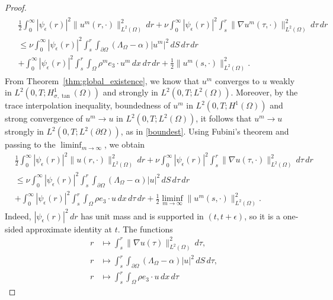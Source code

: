 \documentclass[11pt,reqno]{amsart}
\theoremstyle{plain}
\numberwithin{equation}{section}
\begin{document}
\begin{proof}
    \begin{align*}
    \begin{split}
        &\frac{1}{2}\int_0^\infty|\psi_\epsilon(r)|^2\|u^m(r,\cdot)\|^2_{L^2(\Omega)}\,dr+\nu\int_0^\infty|\psi_\epsilon(r)|^2\int_s^r\|\nabla u^m(\tau,\cdot)\|^2_{L^2(\Omega)}\,d\tau\,dr\\
        &\le \nu\int_0^\infty|\psi_\epsilon(r)|^2\int_s^r\int_{\partial\Omega}(\Lambda_\Omega-\alpha)|u^m|^2\,dS\,d\tau\,dr\\      &+\int_0^\infty|\psi_\epsilon(r)|^2\int_s^r\int_\Omega \rho^m e_3\cdot u^m\,dx\,d\tau\,dr+\frac{1}{2}\|u^m(s,\cdot)\|^2_{L^2(\Omega)}.
        \end{split}
    \end{align*}
    From Theorem~\ref{thm:global_existence}, we know that $u^m$ converges to $u$ weakly in $L^2(0,T;H^1_{\sigma,\tan}(\Omega))$ and strongly in $L^2(0,T;L^2(\Omega))$. Moreover, by the trace interpolation inequality,
    boundedness of $u^m$ in $L^2(0,T;H^1(\Omega))$ and
    strong convergence of $u^m\to u$ in $L^2(0,T;L^2(\Omega))$, it follows that
    $u^m\to u$ strongly in $L^2(0,T;L^2(\partial\Omega))$, as in \eqref{boundest}.
    Using Fubini's theorem and passing to the
    \(\liminf_{m\to\infty}\), we obtain
     \begin{equation}
     \begin{split}
        &\frac{1}{2}\int_0^\infty|\psi_\epsilon(r)|^2\|u(r,\cdot)\|^2_{L^2(\Omega)}\,dr+\nu\int_0^\infty|\psi_\epsilon(r)|^2\int_s^r\|\nabla u(\tau,\cdot)\|^2_{L^2(\Omega)}\,d\tau\,dr
        \\&\le \nu\int_0^\infty|\psi_\epsilon(r)|^2\int_s^r\int_{\partial\Omega}(\Lambda_\Omega-\alpha)|u|^2\,dS\,d\tau\,dr\\      &+\int_0^\infty|\psi_\epsilon(r)|^2\int_s^r\int_\Omega \rho e_3\cdot u\,dx\,d\tau \,dr+\frac{1}{2}\liminf_{m\rightarrow\infty}\|u^m(s,\cdot)\|^2_{L^2(\Omega)}.
    \end{split}
    \end{equation}
    Indeed, \(|\psi_\epsilon(r)|^2\,dr\) has unit mass and is
supported in \((t,t+\epsilon)\), so it is a one-sided approximate identity
at \(t\). The functions
\[
\begin{aligned}
r&\longmapsto\int_s^r\|\nabla u(\tau)\|_{L^2(\Omega)}^2\,d\tau,\\
r&\longmapsto\int_s^r\int_{\partial\Omega}
(\Lambda_\Omega-\alpha)|u|^2\,dS\,d\tau,\\
r&\longmapsto\int_s^r\int_\Omega \rho e_3\cdot u\,dx\,d\tau
\end{aligned}
\]
\end{proof}
\end{document}
